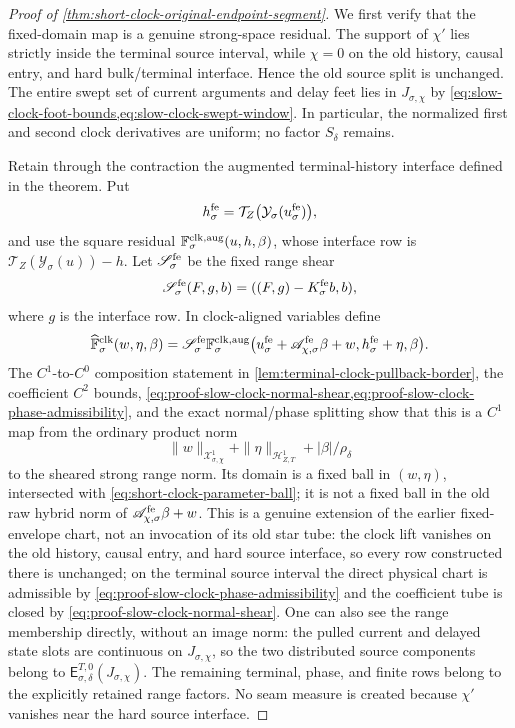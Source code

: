 \begin{proof}[Proof of
\cref{thm:short-clock-original-endpoint-segment}]
We first verify that the fixed-domain map is a genuine strong-space
residual.  The support of \(\chi'\) lies strictly inside the terminal
source interval, while \(\chi=0\) on the old history, causal entry, and
hard bulk/terminal interface.  Hence the old source split is unchanged.
The entire swept set of current arguments and delay feet lies in
\(J_{\sigma,\chi}\) by
\cref{eq:slow-clock-foot-bounds,eq:slow-clock-swept-window}.  In
particular, the normalized first and second clock derivatives are
uniform; no factor \(S_\delta\) remains.

Retain through the contraction the augmented terminal-history interface
defined in the theorem.  Put
\[
 h_\sigma^{\rm fe}
 =\mathcal T_Z\bigl(\mathcal Y_\sigma(u_\sigma^{\rm fe})\bigr),
\]
and use the square residual
\(\mathbb F_\sigma^{\rm clk,aug}(u,h,\beta)\), whose interface row is
\(\mathcal T_Z(\mathcal Y_\sigma(u))-h\).  Let
\(\mathscr S_\sigma^{\rm fe}\) be the fixed range
shear
\[
 \mathscr S_\sigma^{\rm fe}(F,g,b)
   =((F,g)-K_\sigma^{\rm fe}b,b),
\]
where \(g\) is the interface row.  In clock-aligned
variables define
\begin{equation}
 \widehat{\mathbb F}_\sigma^{\rm clk}(w,\eta,\beta)
 =\mathscr S_\sigma^{\rm fe}
   \mathbb F_\sigma^{\rm clk,aug}
    \bigl(u_\sigma^{\rm fe}
       +\mathscr A_{\chi,\sigma}^{\rm fe}\beta+w,
       h_\sigma^{\rm fe}+\eta,\beta\bigr).
                                                        \label{eq:proof-clock-aligned-residual}
\end{equation}
The \(C^1\)-to-\(C^0\) composition statement in
\cref{lem:terminal-clock-pullback-border}, the coefficient \(C^2\) bounds,
\cref{eq:proof-slow-clock-normal-shear,eq:proof-slow-clock-phase-admissibility},
and the exact normal/phase splitting show that this is a \(C^1\) map from
the ordinary product norm
\[
 \|w\|_{\mathcal X_{\sigma,\chi}^1}
       +\|\eta\|_{\mathcal H_{Z,T}^1}
       +|\beta|/\rho_\delta
\]
to the sheared strong range norm.  Its domain is a fixed ball in
\((w,\eta)\),
intersected with \cref{eq:short-clock-parameter-ball}; it is not a fixed
ball in the old raw hybrid norm of
\(\mathscr A_{\chi,\sigma}^{\rm fe}\beta+w\).  This is a genuine extension
of the earlier fixed-envelope chart, not an invocation of its old star
tube: the clock lift vanishes on the old history, causal entry, and hard
source interface, so every row constructed there is unchanged; on the
terminal source interval the direct physical chart is admissible by
\cref{eq:proof-slow-clock-phase-admissibility} and the coefficient tube is
closed by \cref{eq:proof-slow-clock-normal-shear}.  One can also see the range
membership directly, without an image norm: the pulled current and delayed
state slots are continuous on \(J_{\sigma,\chi}\), so the two distributed
source components belong to
\(\mathsf E_{\sigma,\delta}^{T,0}(J_{\sigma,\chi})\).  The remaining
terminal, phase, and finite rows belong to the explicitly retained range
factors.  No seam measure is created because \(\chi'\) vanishes near the
hard source interface.


\end{proof}

